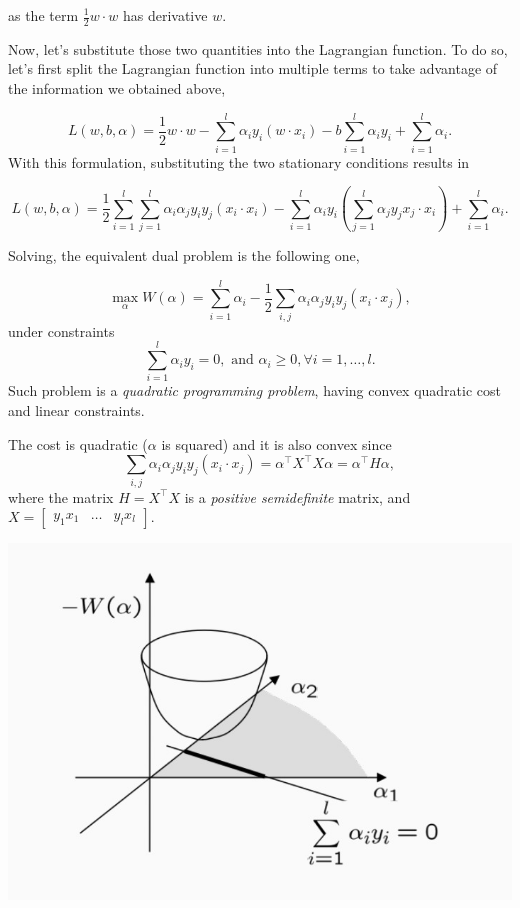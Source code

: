 \documentclass[10pt]{report}
\begin{document}
as the term \(\displaystyle \frac 1 2 w \cdot w\) has derivative \(w\).

Now, let's substitute those two quantities into the Lagrangian function.
To do so, let's first split the Lagrangian function into multiple terms
to take advantage of the information we obtained above,

\[L(w, b, \alpha) = \frac 1 2 w \cdot w - \sum_{i=1}^l \alpha_i y_i(w \cdot x_i) - b\sum_{i=1}^l \alpha_i y_i + \sum_{i=1}^l \alpha_i.\]
With this formulation, substituting the two stationary conditions
results in

\[L(w, b, \alpha) = \frac 1 2 \sum_{i=1}^l \sum_{j=1}^l \alpha_i \alpha_j y_i y_j (x_i \cdot x_i) - \sum_{i=1}^l \alpha_i y_i(\sum_{j=1}^l \alpha_j y_j x_j \cdot x_i) + \sum_{i=1}^l \alpha_i.\]

Solving, the equivalent dual problem is the following one,

\[\max_{\alpha} W(\alpha) = \sum_{i=1}^l \alpha_i - \frac 1 2 \sum_{i,j} \alpha_i \alpha_j y_i y_j (x_i \cdot x_j),\]
under constraints
\[\sum_{i=1}^l \alpha_i y_i = 0, \mbox{ and } \alpha_i \geq 0, \forall i=1,\dots,l.\]
Such problem is a \emph{quadratic programming problem}, having convex
quadratic cost and linear constraints.

The cost is quadratic (\(\alpha\) is squared) and it is also convex since
\[\sum_{i,j} \alpha_i \alpha_j y_i y_j (x_i \cdot x_j) = \alpha^\top X^\top X \alpha = \alpha^\top H \alpha,\]
where the matrix \(H = X^\top X\) is a \emph{positive semidefinite} matrix,
and \(X = \begin{bmatrix} y_1 x_1 & \dots & y_l x_l\end{bmatrix}.\)

\begin{center}
\includegraphics[width=.9\linewidth]{./pics/svm/svm-quadratic-programming.jpg}
\end{center}
\end{document}
